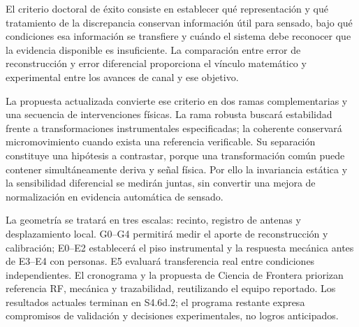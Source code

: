 El criterio doctoral de éxito consiste en establecer qué representación y qué tratamiento
de la discrepancia conservan información útil para sensado, bajo qué condiciones esa
información se transfiere y cuándo el sistema debe reconocer que la evidencia disponible
es insuficiente. La comparación entre error de reconstrucción y error diferencial
proporciona el vínculo matemático y experimental entre los avances de canal y ese objetivo.

La propuesta actualizada convierte ese criterio en dos ramas complementarias y una
secuencia de intervenciones físicas. La rama robusta buscará estabilidad frente a
transformaciones instrumentales especificadas; la coherente conservará micromovimiento
cuando exista una referencia verificable. Su separación constituye una hipótesis a
contrastar, porque una transformación común puede contener simultáneamente deriva y
señal física. Por ello la invariancia estática y la sensibilidad diferencial se medirán
juntas, sin convertir una mejora de normalización en evidencia automática de sensado.

La geometría se tratará en tres escalas: recinto, registro de antenas y desplazamiento
local. G0--G4 permitirá medir el aporte de reconstrucción y calibración; E0--E2 establecerá
el piso instrumental y la respuesta mecánica antes de E3--E4 con personas. E5 evaluará
transferencia real entre condiciones independientes. El cronograma y la propuesta de
Ciencia de Frontera priorizan referencia RF, mecánica y trazabilidad, reutilizando el
equipo reportado. Los resultados actuales terminan en S4.6d.2; el programa restante
expresa compromisos de validación y decisiones experimentales, no logros anticipados.

